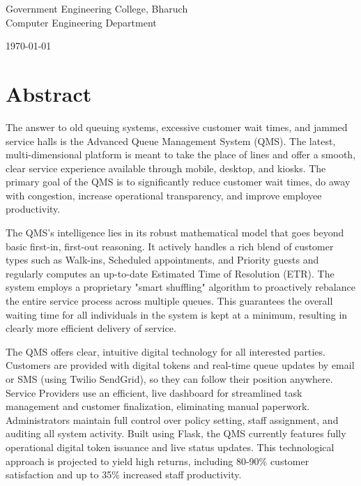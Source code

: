 \documentclass[12pt,a4paper]{report}
\begin{document}
\begin{titlepage}
    \vfill
    
    {\large Government Engineering College, Bharuch}\\[0.2cm]
    {\normalsize Computer Engineering Department}
    
    \vspace{0.5cm}
    
    {\large\today}
    
\end{titlepage}

\newpage
\chapter*{Abstract}

The answer to old queuing systems, excessive customer wait times, and jammed service halls is the Advanced Queue Management System (QMS). The latest, multi-dimensional platform is meant to take the place of lines and offer a smooth, clear service experience available through mobile, desktop, and kiosks. The primary goal of the QMS is to significantly reduce customer wait times, do away with congestion, increase operational transparency, and improve employee productivity.

The QMS's intelligence lies in its robust mathematical model that goes beyond basic first-in, first-out reasoning. It actively handles a rich blend of customer types such as Walk-ins, Scheduled appointments, and Priority guests and regularly computes an up-to-date Estimated Time of Resolution (ETR). The system employs a proprietary "smart shuffling" algorithm to proactively rebalance the entire service process across multiple queues. This guarantees the overall waiting time for all individuals in the system is kept at a minimum, resulting in clearly more efficient delivery of service.

The QMS offers clear, intuitive digital technology for all interested parties. Customers are provided with digital tokens and real-time queue updates by email or SMS (using Twilio SendGrid), so they can follow their position anywhere. Service Providers use an efficient, live dashboard for streamlined task management and customer finalization, eliminating manual paperwork. Administrators maintain full control over policy setting, staff assignment, and auditing all system activity. Built using Flask, the QMS currently features fully operational digital token issuance and live status updates. This technological approach is projected to yield high returns, including 80-90\% customer satisfaction and up to 35\% increased staff productivity.
\end{document}

